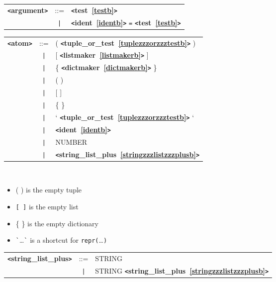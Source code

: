\label{argumentb}
\begin{tabular}{lcl}
{\bf \verb+<+argument\verb+>+} & ::=  & {\bf \verb+<+test~\ref{testb}\verb+>+}  \\
 & \verb+|+  & {\bf \verb+<+ident~\ref{identb}\verb+>+}  \verb|=| {\bf \verb+<+test~\ref{testb}\verb+>+}  \\
\end{tabular}

\label{atomb}
\begin{tabular}{lcl}
{\bf \verb+<+atom\verb+>+} & ::=  & ( {\bf \verb+<+tuple\_or\_test~\ref{tuplezzzorzzztestb}\verb+>+}  ) \\
 & \verb+|+  & [ {\bf \verb+<+listmaker~\ref{listmakerb}\verb+>+}  ] \\
 & \verb+|+  & \{ {\bf \verb+<+dictmaker~\ref{dictmakerb}\verb+>+}  \} \\
 & \verb+|+  & ( ) \\
 & \verb+|+  & [ ] \\
 & \verb+|+  & \{ \} \\
 & \verb+|+  & ` {\bf \verb+<+tuple\_or\_test~\ref{tuplezzzorzzztestb}\verb+>+}  ` \\
 & \verb+|+  & {\bf \verb+<+ident~\ref{identb}\verb+>+}  \\
 & \verb+|+  & NUMBER \\
 & \verb+|+  & {\bf \verb+<+string\_list\_plus~\ref{stringzzzlistzzzplusb}\verb+>+}  \\
\end{tabular} \\

\begin{itemize}
\item ( ) is the empty tuple
\item \verb|[ ]| is the empty list
\item \{ \} is the empty dictionary
\item \verb|`|\ldots\verb|`| is a shortcut for \verb|repr(|\ldots\verb|)|
\end{itemize}

\label{stringzzzlistzzzplusb}
\begin{tabular}{lcl}
{\bf \verb+<+string\_list\_plus\verb+>+} & ::=  & STRING \\
 & \verb+|+  & STRING {\bf \verb+<+string\_list\_plus~\ref{stringzzzlistzzzplusb}\verb+>+}  \\
\end{tabular}

